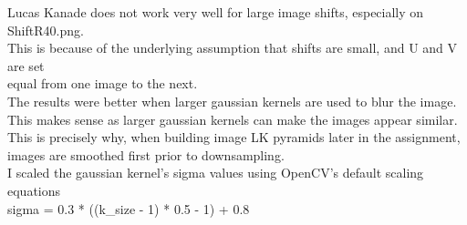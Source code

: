 Lucas Kanade does not work very well for large image shifts, especially on ShiftR40.png. \\
This is because of the underlying assumption that shifts are small, and U and V are set \\
equal from one image to the next.\\

The results were better when larger gaussian kernels are used to blur the image.\\
This makes sense as larger gaussian kernels can make the images appear similar.\\
This is precisely why, when building image LK pyramids later in the assignment, \\
images are smoothed first prior to downsampling.\\
I scaled the gaussian kernel's sigma values using OpenCV's default scaling equations\\
sigma = 0.3 * ((k_size - 1) * 0.5 - 1) + 0.8\\
